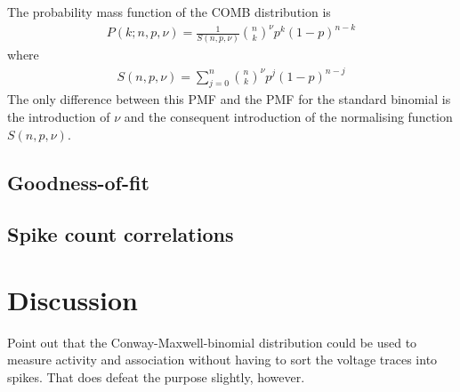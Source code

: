 \documentclass[a4paper,12pt]{article}
\theoremstyle{definition}
\begin{document}
      The probability mass function of the COMB distribution is 
      \begin{align}\label{eq:comb_pmf}
        P(k;n,p,\nu) = \frac{1}{S(n,p,\nu)}\binom{n}{k}^{\nu} p^k (1-p)^{n-k}
      \end{align}
      where 
      \begin{align}\label{eq:comb_norm}
        S(n,p,\nu) = \sum_{j=0}^n \binom{n}{k}^{\nu} p^j (1-p)^{n-j}
      \end{align}
      The only difference between this PMF and the PMF for the standard binomial is the introduction of $\nu$ and the consequent introduction of the normalising function $S(n,p,\nu)$.

    \subsection{Goodness-of-fit}

    \subsection{Spike count correlations}

\section{Discussion}
Point out that the Conway-Maxwell-binomial distribution could be used to measure activity and association without having to sort the voltage traces into spikes. That does defeat the purpose slightly, however. 

\newpage

\end{document}
